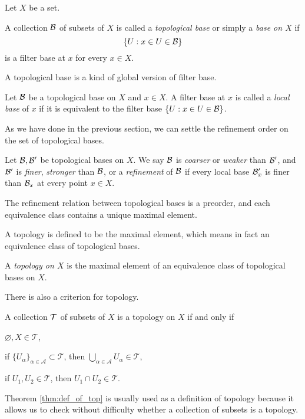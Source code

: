 \documentclass{../crs}
\begin{document}
Let $X$ be a set.
\begin{defn}
A collection $\mathcal{B}$ of subsets of $X$ is called a \emph{topological base} or simply a \emph{base on $X$} if
\[\{U:x\in U\in\mathcal{B}\}\]
is a filter base at $x$ for every $x\in X$.
\end{defn}

A topological base is a kind of global version of filter base.

\begin{defn}
Let $\mathcal{B}$ be a topological base on $X$ and $x\in X$.
A filter base at $x$ is called a \emph{local base} of $x$ if it is equivalent to the filter base $\{U:x\in U\in\mathcal{B}\}$.
\end{defn}

As we have done in the previous section, we can settle the refinement order on the set of topological bases.

\begin{defn}
Let $\mathcal{B},\mathcal{B}'$ be topological bases on $X$.
We say $\mathcal{B}$ is \emph{coarser} or \emph{weaker} than $\mathcal{B}'$, and $\mathcal{B}'$ is \emph{finer}, \emph{stronger} than $\mathcal{B}$, or a \emph{refinement} of $\mathcal{B}$ if every local base $\mathcal{B}'_x$ is finer than $\mathcal{B}_x$ at every point $x\in X$.
\end{defn}
\begin{prop}
The refinement relation between topological bases is a preorder, and each equivalence class contains a unique maximal element.
\end{prop}
\begin{pf}
\end{pf}

A topology is defined to be the maximal element, which means in fact an equivalence class of topological bases.

\begin{defn}
A \emph{topology on $X$} is the maximal element of an equivalence class of topological bases on $X$.
\end{defn}

There is also a criterion for topology.

\begin{thm}\label{thm:def_of_top}
A collection $\mathcal{T}$ of subsets of $X$ is a topology on $X$ if and only if
\begin{cond}
\item $\varnothing,X\in\mathcal{T}$,
\item if $\{U_\alpha\}_{\alpha\in\mathcal{A}}\subset\mathcal{T}$, then $\bigcup_{\alpha\in\mathcal{A}}U_\alpha\in\mathcal{T}$,
\item if $U_1,U_2\in\mathcal{T}$, then $U_1\cap U_2\in\mathcal{T}$.
\end{cond}
\end{thm}
\begin{pf}
\end{pf}
Theorem \ref{thm:def_of_top} is usually used as a definition of topology because it allows us to check without difficulty whether a collection of subsets is a topology.
\end{document}
